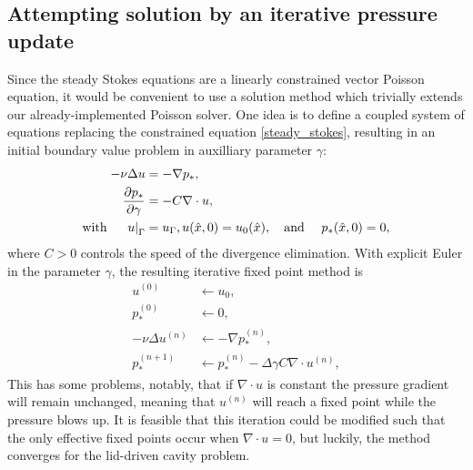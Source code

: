 \subsection{Attempting solution by an iterative pressure update}
Since the steady Stokes equations are a linearly constrained vector Poisson equation,
it would be convenient to use a solution method which trivially extends our already-implemented Poisson solver.
One idea is to define a coupled system of equations replacing the constrained equation \eqref{steady_stokes}, resulting in an initial boundary value problem
in auxilliary parameter $\gamma$:
\begin{equation}
\begin{split}
    -\nu\Delta u &= -\nabla p_*,\\
    \frac{\partial p_*}{\partial \gamma} &= -C\nabla\cdot u,\\
    \text{with \quad} \left.u\right|_\Gamma &= u_\Gamma, u(\hat{x}, 0) = u_0(\hat{x}), \text{\quad and \quad} p_*(\hat{x}, 0) = 0,
\end{split}
\end{equation}
where $C > 0$ controls the speed of the divergence elimination.
With explicit Euler in the parameter $\gamma$, the resulting iterative fixed point method is
\begin{equation}
\begin{split}
    u^{(0)} &\leftarrow u_0,\\
    p_*^{(0)} &\leftarrow 0,\\
    -\nu\Delta u^{(n)} &\leftarrow -\nabla p_*^{(n)},\\
    p_*^{(n+1)} &\leftarrow p_*^{(n)} - \Delta\gamma C\nabla\cdot u^{(n)},
\end{split}
\end{equation}
This has some problems, notably, that if $\nabla\cdot u$ is constant the pressure gradient will remain unchanged, meaning
that $u^{(n)}$ will reach a fixed point while the pressure blows up. It is feasible that this iteration could be modified such that the only
effective fixed points occur when $\nabla\cdot u = 0$, but luckily, the method converges for the lid-driven cavity problem.

